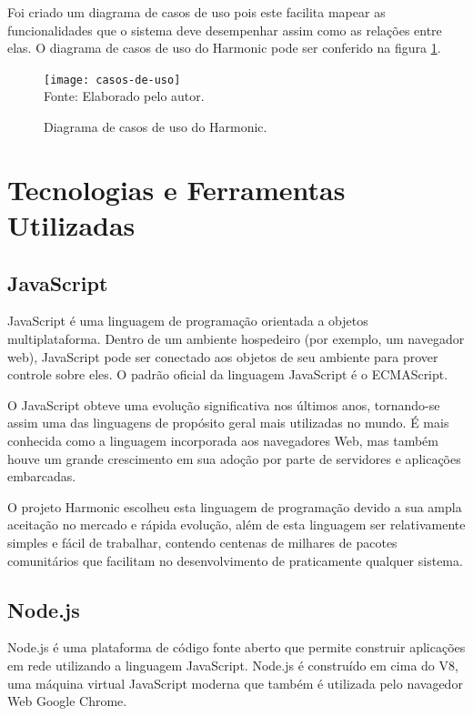 \documentclass[ppginf, pep]{esinucpel}
\begin{document}
Foi criado um diagrama de casos de uso pois este facilita mapear as funcionalidades que o sistema deve desempenhar assim como as relações entre elas. O diagrama de casos de uso do Harmonic pode ser conferido na figura \ref{fig:casos_de_uso}.

\begin{figure}[H]
    \centering
    \caption{Diagrama de casos de uso do Harmonic.}
    \vspace{5pt}
    \texttt{[image: casos-de-uso]}
    \\Fonte: Elaborado pelo autor.
    \label{fig:casos_de_uso}
\end{figure}

\chapter{Tecnologias e Ferramentas Utilizadas}

\section{JavaScript}

JavaScript é uma linguagem de programação orientada a objetos multiplataforma. Dentro de um ambiente hospedeiro (por exemplo, um navegador web), JavaScript pode ser conectado aos objetos de seu ambiente para prover controle sobre eles. O padrão oficial da linguagem JavaScript é o ECMAScript. \cite{mdn_js_intro}

O JavaScript obteve uma evolução significativa nos últimos anos, tornando-se assim uma das linguagens de propósito geral mais utilizadas no mundo. É mais conhecida como a linguagem incorporada aos navegadores Web, mas também houve um grande crescimento em sua adoção por parte de servidores e aplicações embarcadas. \cite{es2015}

O projeto Harmonic escolheu esta linguagem de programação devido a sua ampla aceitação no mercado e rápida evolução, além de esta linguagem ser relativamente simples e fácil de trabalhar, contendo centenas de milhares de pacotes comunitários que facilitam no desenvolvimento de praticamente qualquer sistema.

\section{Node.js}

Node.js é uma plataforma de código fonte aberto que permite construir aplicações em rede utilizando a linguagem JavaScript. Node.js é construído em cima do V8, uma máquina virtual JavaScript moderna que também é utilizada pelo navagedor Web Google Chrome. \cite{instant_nodejs_starter:03}
\end{document}
